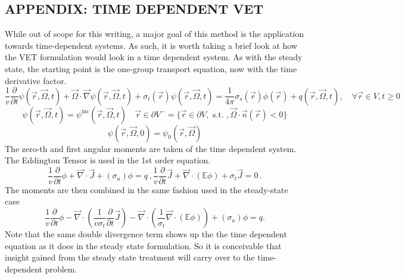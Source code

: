 \documentclass[12pt]{report}
\newcommand{\vr}{\vec{r}}
\newcommand{\vO}{\vec{\Omega}}
\renewcommand{\div}{\vec{\nabla} \cdot}
\newcommand{\grad}{\vec{\nabla}}
\newcommand{\Edd}{\mathbb{E}}
\newcommand{\sigt}{\sigma_t}
\newcommand{\sigs}{\sigma_s}
\newcommand{\siga}{\sigma_a}
\newcommand{\scalSource}{q}
\begin{document}
\begin{appendices}
\chapter{ \uppercase{APPENDIX: Time Dependent VET} } \label{chap:appx1}
While out of scope for this writing, a major goal of this method is the application towards time-dependent systems. As such, it is worth taking a brief look at how the VET formulation would look in a time dependent system. As with the steady state, the starting point is the one-group transport equation, now with the time derivative factor.
\begin{equation}
\label{Trans1GTE}
\frac{1}{v} \frac{\partial}{\partial t} \psi(\vr,\vO,t)+ \vO \cdot \grad \psi(\vr,\vO,t) + \sigt(\vr) \psi(\vr,\vO,t) = \frac{1}{4 \pi} \sigs(\vr) \phi(\vr) + q(\vr,\vO,t), \quad \forall \vr \in V,t \geq 0
\end{equation}
\begin{equation}
\label{Trans1GTE_bc}
\psi(\vr,\vO,t) = \psi^{\text{inc}}(\vr,\vO,t) \quad \vr \in \partial V^{-} = \{ \vr \in \partial V, \text{ s.t. }, \vO \cdot \vec{n}(\vr) < 0\}
\end{equation}
\begin{equation}
\label{Trans1GTE_t0}
\psi(\vr,\vO,0) = \psi_0(\vr,\vO)
\end{equation}
The zero-th and first angular moments are taken of the time dependent system. The Eddington Tensor is used in the 1st order equation.
\begin{subequations}
%
\begin{equation}
\label{0amTrans}
\frac{1}{v} \frac{\partial}{\partial t}\phi + \div \vec{J} + (\siga) \phi = \scalSource \,,
\end{equation}
%
\begin{equation}
\label{1amTrans}
\frac{1}{v} \frac{\partial}{\partial t}\vec{J}  + \div \left( \Edd \phi \right) + \sigt \vec{J} = 0 \,.
\end{equation}
%
\end{subequations}
The moments are then combined in the same fashion used in the steady-state case
\begin{equation}
\label{VETTrans}
\frac{1}{v} \frac{\partial}{\partial t}\phi - \div \left( \frac{1}{v \sigt} \frac{\partial}{\partial t}\vec{J} \right)   - \div \left( \frac{1}{\sigt} \div \left( \Edd \phi \right) \right)  + (\siga) \phi = \scalSource.
\end{equation}
Note that the same double divergence term shows up the the time dependent equation as it does in the steady state formulation. So it is conceivable that insight gained from the steady state treatment will carry over to the time-dependent problem. 

\end{appendices}
\end{document}
